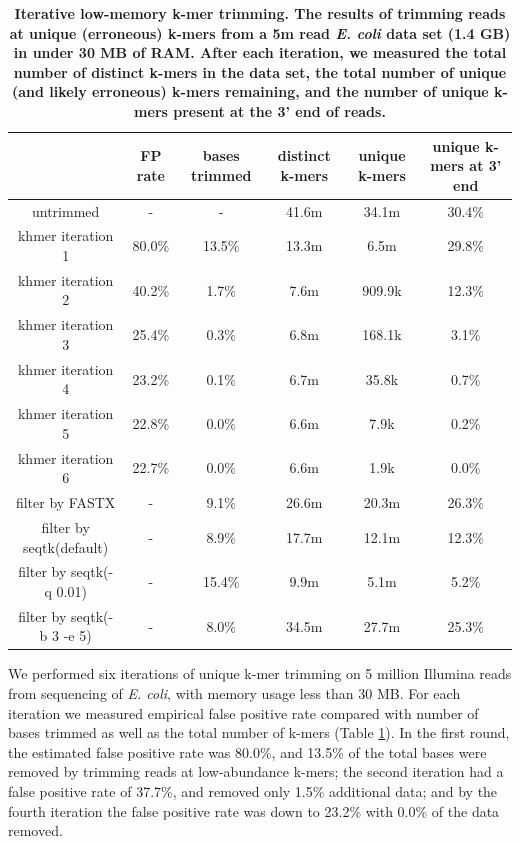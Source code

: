 \begin{table}[!ht]
\footnotesize
\caption{
\bf{Iterative low-memory k-mer trimming.  The results of trimming
  reads at unique (erroneous) k-mers from a 5m read {\em E. coli} data set (1.4 GB)
  in under 30 MB of RAM.  After each iteration, we measured the
  total number of distinct k-mers in the data set, the total number
  of unique (and likely erroneous) k-mers remaining, and the
  number of unique k-mers present at the 3' end of reads.}}
\begin{tabular}{ | c | c | c | c | c | c |}
\hline
 & FP rate & bases trimmed & distinct k-mers & unique k-mers & 
unique k-mers at 3' end \\
\hline
untrimmed                           &      -  &      - & 41.6m & 34.1m & 30.4\%  \\
khmer iteration 1                   & 80.0\%  & 13.5\% & 13.3m &  6.5m & 29.8\% \\
khmer iteration 2                   & 40.2\%  &  1.7\% &  7.6m & 909.9k & 12.3\% \\
khmer iteration 3                   & 25.4\%  &  0.3\% &  6.8m & 168.1k & 3.1\% \\
khmer iteration 4                   & 23.2\%  &  0.1\% &  6.7m &  35.8k & 0.7\% \\
khmer iteration 5                   & 22.8\%  &  0.0\% &  6.6m &   7.9k & 0.2\% \\
khmer iteration 6                   & 22.7\%  &  0.0\% &  6.6m &   1.9k & 0.0\% \\
filter by FASTX                     &      -  &  9.1\% & 26.6m & 20.3m & 26.3\% \\
filter by seqtk(default)            &      -  &  8.9\% & 17.7m & 12.1m & 12.3\% \\
filter by seqtk(-q 0.01)            &      -  & 15.4\% &  9.9m &  5.1m &  5.2\% \\
filter by seqtk(-b 3 -e 5)          &      -  &  8.0\% & 34.5m & 27.7m & 25.3\% \\
\end{tabular}
\begin{flushleft}
\end{flushleft}
\label{table:loop_trim}
\end{table}


We performed six iterations of unique k-mer trimming on 5 million Illumina
reads from sequencing of {\em E. coli}, with memory usage less than 30 MB.  For
each iteration we measured empirical false positive rate compared with number
of bases trimmed as well as the total number of k-mers (Table
\ref{table:loop_trim}).  In the first round, the estimated false positive rate
was 80.0\%, and 13.5\% of the total bases were removed by trimming reads at
low-abundance k-mers; the second iteration had a false positive rate of 37.7\%,
and removed only 1.5\% additional data; and by the fourth iteration the false
positive rate was down to 23.2\% with 0.0\% of the data removed.

